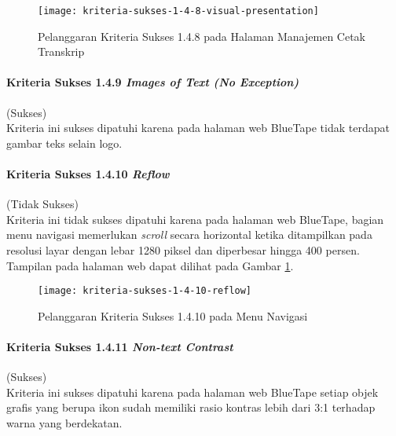 \begin{figure}[H]
    \centering  
    \texttt{[image: kriteria-sukses-1-4-8-visual-presentation]}  
    \caption[Pelanggaran Kriteria Sukses 1.4.8 pada Halaman Manajemen Cetak Transkrip]{Pelanggaran Kriteria Sukses 1.4.8 pada Halaman Manajemen Cetak Transkrip}
    \label{fig:1.4.8_visual_presentation}  
\end{figure} 

\paragraph{Kriteria Sukses 1.4.9 \textit{Images of Text (No Exception)}}
\label{par:kepatuhan_bluetape_kriteria_sukses_1.4.9}
(Sukses)\\

Kriteria ini sukses dipatuhi karena pada halaman web BlueTape tidak terdapat gambar teks selain logo.

\paragraph{Kriteria Sukses 1.4.10 \textit{Reflow}}
\label{par:kepatuhan_bluetape_kriteria_sukses_1.4.10}
(Tidak Sukses)\\

Kriteria ini tidak sukses dipatuhi karena pada halaman web BlueTape, bagian menu navigasi memerlukan \textit{scroll} secara horizontal ketika ditampilkan pada resolusi layar dengan lebar 1280 piksel dan diperbesar hingga 400 persen. Tampilan pada halaman web dapat dilihat pada Gambar \ref{fig:1.4.8_visual_presentation}.

\begin{figure}[H]
    \centering  
    \texttt{[image: kriteria-sukses-1-4-10-reflow]}  
    \caption[Pelanggaran Kriteria Sukses 1.4.10 pada Menu Navigasi]{Pelanggaran Kriteria Sukses 1.4.10 pada Menu Navigasi}
    \label{fig:1.4.10_reflow}  
\end{figure} 

\paragraph{Kriteria Sukses 1.4.11 \textit{Non-text Contrast}}
\label{par:kepatuhan_bluetape_kriteria_sukses_1.4.11}
(Sukses)\\

Kriteria ini sukses dipatuhi karena pada halaman web BlueTape setiap objek grafis yang berupa ikon sudah memiliki rasio kontras lebih dari 3:1 terhadap warna yang berdekatan.

